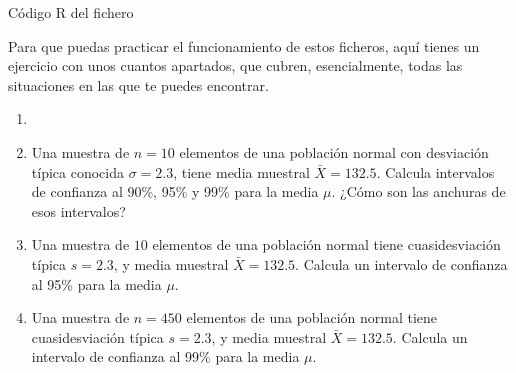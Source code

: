 \documentclass[10pt,a4paper]{article}\usepackage[]{graphicx}\usepackage[]{color}
\newcounter {cont01}
\begin{document}
\begin{table}[p]

\caption{Código R del fichero }
\label{tut05:tabla:Tut06-IntConf-Media-UsandoZ-MuestraEnBruto.R}
\end{table}
Para que puedas practicar el funcionamiento de estos ficheros, aquí tienes un ejercicio con unos cuantos apartados, que cubren, esencialmente, todas las situaciones en las que te puedes encontrar.

\begin{ejercicio}
\label{tut06:ejercicio06}
\begin{enumerate}
  \item[]

  \item Una muestra de $n= 10$ elementos de una población normal con desviación típica conocida $\sigma=2.3$, tiene media muestral $\bar X=132.5$. Calcula intervalos  de confianza al 90\%, 95\% y 99\% para la media $\mu$. ¿Cómo son las anchuras de esos intervalos?

  \item Una muestra de $10$ elementos de una población normal tiene cuasidesviación típica $s=2.3$, y media muestral $\bar X=132.5$. Calcula un intervalo  de confianza al 95\% para la media $\mu$.

  \item Una muestra de $n = 450$ elementos de una población normal tiene cuasidesviación típica $s=2.3$, y media muestral $\bar X=132.5$. Calcula un intervalo de confianza al 99\% para la media $\mu$.


\end{enumerate}
\end{ejercicio}
\end{document}
